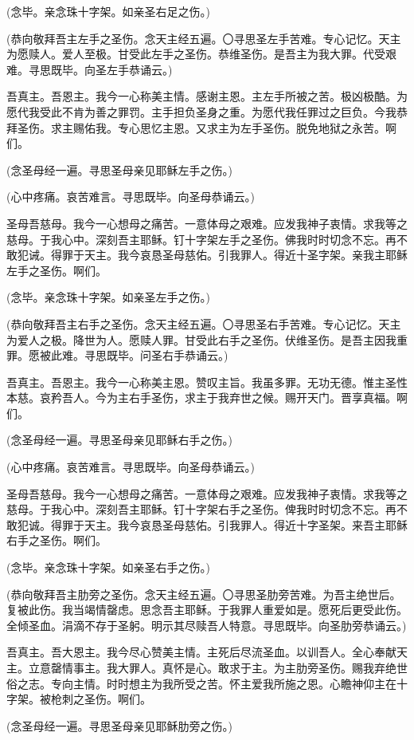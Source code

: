 \documentclass[UTF8,17pt]{ctexart}
\begin{document}
(念毕。亲念珠⼗字架。如亲圣右⾜之伤。)

(恭向敬拜吾主左⼿之圣伤。念天主经五遍。〇寻思圣左⼿苦难。专⼼记忆。天主为愿赎⼈。爱⼈⾄极。⽢受此左⼿之圣伤。恭维圣伤。是吾主为我⼤罪。代受艰难。寻思既毕。向圣左⼿恭诵云。)

吾真主。吾恩主。我今⼀⼼称美主情。感谢主恩。主左⼿所被之苦。极凶极酷。为愿代我受此不肯为善之罪罚。主⼿担负圣⾝之重。为愿代我任罪过之巨负。今我恭拜圣伤。求主赐佑我。专⼼思忆主恩。又求主为左⼿圣伤。脱免地狱之永苦。啊们。

(念圣母经⼀遍。寻思圣母亲见耶稣左手之伤。)

(⼼中疼痛。哀苦难⾔。寻思既毕。向圣母恭诵云。)

圣母吾慈母。我今⼀⼼想母之痛苦。⼀意体母之艰难。应发我神⼦衷情。求我等之慈母。于我⼼中。深刻吾主耶稣。钉⼗字架左⼿之圣伤。佛我时时切念不忘。再不敢犯诫。得罪于天主。我今哀恳圣母慈佑。引我罪⼈。得近⼗圣字架。亲我主耶稣左⼿之圣伤。啊们。

(念毕。亲念珠⼗字架。如亲圣左⼿之伤。)

(恭向敬拜吾主右⼿之圣伤。念天主经五遍。〇寻思圣右⼿苦难。专⼼记忆。天主为爱⼈之极。降世为⼈。愿赎⼈罪。⽢受此右⼿之圣伤。伏维圣伤。是吾主因我重罪。愿被此难。寻思既毕。问圣右⼿恭诵云。)

吾真主。吾恩主。我今⼀⼼称美主恩。赞叹主旨。我虽多罪。⽆功⽆德。惟主圣性本慈。哀矜吾⼈。今为主右⼿圣伤，求主于我弃世之候。赐开天门。晋享真福。啊们。

(念圣母经⼀遍。寻思圣母亲见耶稣右手之伤。)

(⼼中疼痛。哀苦难⾔。寻思既毕。向圣母恭诵云。)

圣母吾慈母。我今⼀⼼想母之痛苦。⼀意体母之艰难。应发我神⼦衷情。求我等之慈母。于我⼼中。深刻吾主耶稣。钉⼗字架右⼿之圣伤。俾我时时切念不忘。再不敢犯诚。得罪于天主。我今哀恳圣母慈佑。引我罪⼈。得近⼗字圣架。来吾主耶稣右⼿之圣伤。啊们。

(念毕。亲念珠⼗字架。如亲圣右⼿之伤。)

(恭向敬拜吾主肋旁之圣伤。念天主经五遍。〇寻思圣肋旁苦难。为吾主绝世后。复被此伤。我当竭情罄虑。思念吾主耶稣。于我罪⼈重爱如是。愿死后更受此伤。全倾圣⾎。涓滴不存于圣躬。明⽰其尽赎吾⼈特意。寻思既毕。向圣肋旁恭诵云。)

吾真主。吾⼤恩主。我今尽⼼赞美主情。主死后尽流圣⾎。以训吾⼈。全⼼奉献天主。⽴意罄情事主。我⼤罪⼈。真怀是⼼。敢求于主。为主肋旁圣伤。赐我弃绝世俗之志。专向主情。时时想主为我所受之苦。怀主爱我所施之恩。⼼瞻神仰主在⼗字架。被枪刺之圣伤。啊们。

(念圣母经⼀遍。寻思圣母亲见耶稣肋旁之伤。)
\end{document}
